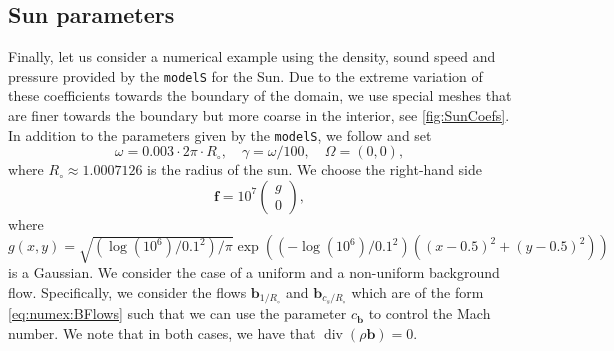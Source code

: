 \documentclass{m2an}
\newcommand{\bflow}{\mathbf{b}}
\renewcommand{\div}{\operatorname{div}}
\newcommand{\bff}{\mathbf{f}}
\theoremstyle{plain}
\theoremstyle{definition}
\begin{document}
\subsection{Sun parameters}\label{subsec:numex:sun}
Finally, let us consider a numerical example using the density, sound speed and pressure provided by the \texttt{modelS} \cite{modelS} for the Sun. Due to the extreme variation of these coefficients towards the boundary of the domain, we use special meshes that are finer towards the boundary but more coarse in the interior, see \cref{fig:SunCoefs}. In addition to the parameters given by the \texttt{modelS}, we follow \cite{CD18} and set 
\begin{equation*}
   \omega = 0.003 \cdot 2\pi \cdot R_{\circ}, \quad \gamma = \omega / 100, \quad \Omega = (0,0),
\end{equation*}
where $R_{\circ} \approx 1.0007126$ is the radius of the sun. We choose the right-hand side 
\begin{equation*}
   \bff = 10^7 \begin{pmatrix}
      g \\ 0
   \end{pmatrix}, 
\end{equation*}
where $g(x,y) = \sqrt{(\log(10^6)/0.1^2)/\pi} \exp((-\log(10^6)/0.1^2)((x-0.5)^2+(y-0.5)^2))$ is a Gaussian. We consider the case of a uniform and a non-uniform background flow. Specifically, we consider the flows $\bflow_{1/R_{\circ}}$ and $\bflow_{c_s/R_{\circ}}$ which are of the form \eqref{eq:numex:BFlows} such that we can use the parameter $c_{\bflow}$ to control the Mach number. We note that in both cases, we have that $\div(\rho \bflow) = 0$.
\end{document}
